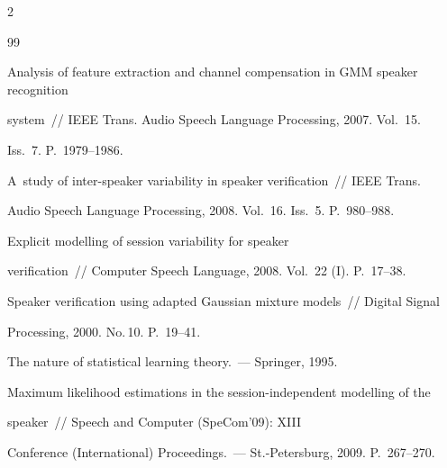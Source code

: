 \begin{multicols}{2}
{{\begin{thebibliography}{99}




 Analysis of feature extraction and channel compensation in GMM speaker recognition 


system~// IEEE Trans. Audio Speech Language Processing, 2007. Vol.~15. 


Iss.~7. P.~1979--1986.


  






  A~study of inter-speaker variability in speaker verification~// IEEE Trans. 


Audio Speech Language Processing, 2008. Vol.~16. Iss.~5. P.~980--988.


  




   Explicit modelling of session variability for speaker 


verification~// Computer Speech Language, 2008. Vol.~22 (I). P.~17--38. 












Speaker verification using adapted Gaussian mixture models~// Digital Signal 


Processing, 2000. No.\,10. P.~19--41.


  




   The nature of statistical learning theory.~--- Springer, 1995.


  


 






  Maximum likelihood estimations in the session-independent modelling of the 


speaker~// Speech and Computer (SpeCom'09):  XIII 


Conference (International) Proceedings.~--- St.-Petersburg, 2009. P.~267--270.






\end{thebibliography}}}
\end{multicols}
